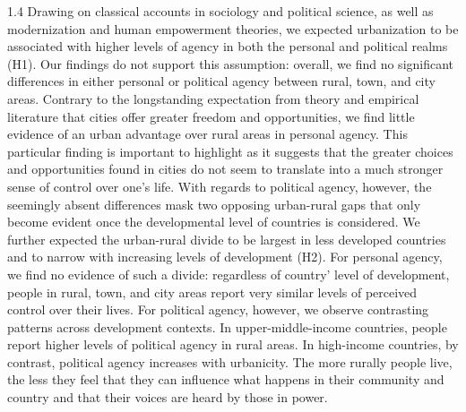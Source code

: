 \documentclass[10pt, letterpaper]{article}
\begin{document}
\begin{spacing}{1.4}
Drawing on classical accounts in sociology and political science, as well as modernization and human
empowerment theories, we expected urbanization to be associated with higher levels of agency in
both the personal and political realms (H1). Our findings do not support this assumption: overall, we
find no significant differences in either personal or political agency between rural, town, and city areas.
Contrary to the longstanding expectation from theory and empirical literature that cities offer greater
freedom and opportunities, we find little evidence of an urban advantage over rural areas in personal
agency. This particular finding is important to highlight as it suggests that the greater choices and
opportunities found in cities do not seem to translate into a much stronger sense of control over one's
life.
With regards to political agency, however, the seemingly absent differences mask two opposing
urban-rural gaps that only become evident once the developmental level of countries is considered.
We further expected the urban-rural divide to be largest in less developed countries and to narrow with
increasing levels of development (H2). For personal agency, we find no evidence of such a divide:
regardless of  country' level of development, people in rural, town, and city areas report very similar
levels of perceived control over their lives. For political agency, however, we observe contrasting
patterns across development contexts. In upper-middle-income countries, people report higher levels
of political agency in rural areas. In high-income countries, by contrast, political agency increases with
urbanicity. The more rurally people live, the less they feel that they can influence what happens in their
community and country and that their voices are heard by those in power.


\end{spacing}
\end{document}
